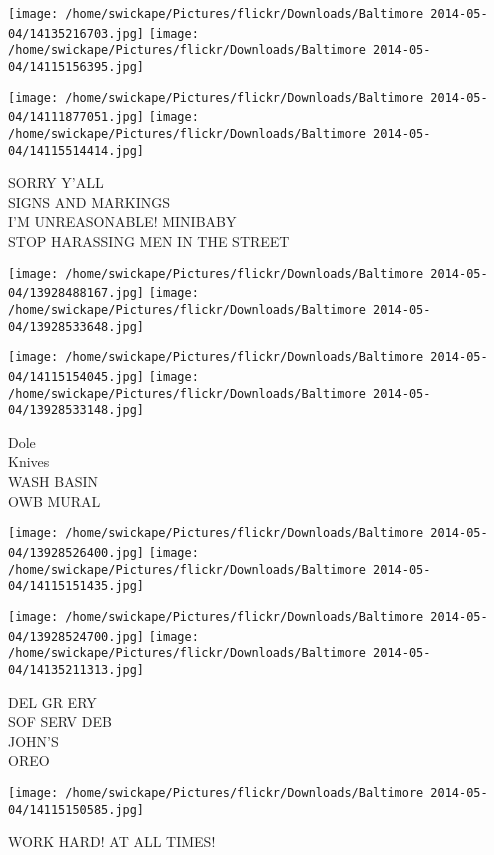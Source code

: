 \documentclass[10pt,letterpaper]{article}
\begin{document}
\texttt{[image: /home/swickape/Pictures/flickr/Downloads/Baltimore 2014-05-04/14135216703.jpg]}
\texttt{[image: /home/swickape/Pictures/flickr/Downloads/Baltimore 2014-05-04/14115156395.jpg]}

\texttt{[image: /home/swickape/Pictures/flickr/Downloads/Baltimore 2014-05-04/14111877051.jpg]}
\texttt{[image: /home/swickape/Pictures/flickr/Downloads/Baltimore 2014-05-04/14115514414.jpg]}

SORRY Y'ALL\\
SIGNS AND MARKINGS\\
I'M UNREASONABLE! MINIBABY\\
STOP HARASSING MEN IN THE STREET\\
\pagebreak

\texttt{[image: /home/swickape/Pictures/flickr/Downloads/Baltimore 2014-05-04/13928488167.jpg]}
\texttt{[image: /home/swickape/Pictures/flickr/Downloads/Baltimore 2014-05-04/13928533648.jpg]}

\texttt{[image: /home/swickape/Pictures/flickr/Downloads/Baltimore 2014-05-04/14115154045.jpg]}
\texttt{[image: /home/swickape/Pictures/flickr/Downloads/Baltimore 2014-05-04/13928533148.jpg]}

Dole\\
Knives\\
WASH BASIN\\
OWB MURAL\\
\pagebreak

\texttt{[image: /home/swickape/Pictures/flickr/Downloads/Baltimore 2014-05-04/13928526400.jpg]}
\texttt{[image: /home/swickape/Pictures/flickr/Downloads/Baltimore 2014-05-04/14115151435.jpg]}

\texttt{[image: /home/swickape/Pictures/flickr/Downloads/Baltimore 2014-05-04/13928524700.jpg]}
\texttt{[image: /home/swickape/Pictures/flickr/Downloads/Baltimore 2014-05-04/14135211313.jpg]}

DEL GR ERY\\
SOF SERV DEB\\
JOHN'S\\
OREO\\
\pagebreak

\texttt{[image: /home/swickape/Pictures/flickr/Downloads/Baltimore 2014-05-04/14115150585.jpg]}

WORK HARD!  AT ALL TIMES!\\
\pagebreak
\end{document}
